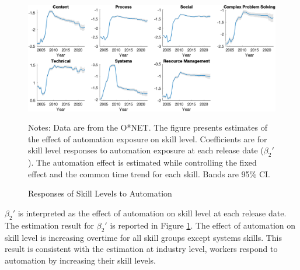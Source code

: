 \documentclass[12pt]{article}
\begin{document}
\begin{figure}[h!]
\includegraphics[width = \textwidth]{LV}
\caption{Responses of Skill Levels to Automation}
\label{LV}
{\scriptsize Notes: Data are from the O*NET. The figure presents estimates of the effect of automation exposure on skill level. Coefficients are for skill level responses to automation exposure at each release date ($\beta_2'$). The automation effect is estimated while controlling the fixed effect and the common time trend for each skill. Bands are 95\% CI.}
\end{figure}
$\beta_2'$ is interpreted as the effect of automation on skill level at each release date. The estimation result for $\beta_2'$ is reported in Figure \ref{LV}. The effect of automation on skill level is increasing overtime for all skill groups except systems skills. This result is consistent with the estimation at industry level, workers respond to automation by increasing their skill levels. 
\end{document}
